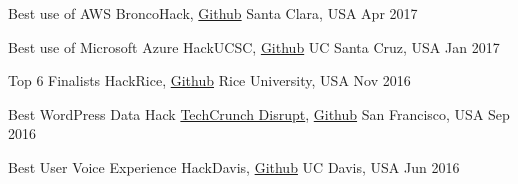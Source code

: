 \begin{cvhonors}

  \cvhonor
    {Best use of AWS} %
    {BroncoHack, \href{https://github.com/desaiuditd/slycam}{\color{awesome}Github}} %
    {Santa Clara, USA} %
    {Apr 2017} %

  \cvhonor
    {Best use of Microsoft Azure} %
    {HackUCSC, \href{https://github.com/desaiuditd/outtatheblues}{\color{awesome}Github}} %
    {UC Santa Cruz, USA} %
    {Jan 2017} %

  \cvhonor
    {Top 6 Finalists} %
    {HackRice, \href{https://github.com/desaiuditd/wayfarer}{\color{awesome}Github}} %
    {Rice University, USA} %
    {Nov 2016} %

  \cvhonor
    {Best WordPress Data Hack} %
    {\href{https://techcrunch.com/video/incognitech-2/}{\color{awesome}TechCrunch Disrupt}, \href{https://github.com/desaiuditd/incognitech}{\color{awesome}Github}} %
    {San Francisco, USA} %
    {Sep 2016} %

  \cvhonor
    {Best User Voice Experience} %
    {HackDavis, \href{https://github.com/desaiuditd/roomscore}{\color{awesome}Github}} %
    {UC Davis, USA} %
    {Jun 2016} %

\end{cvhonors}
